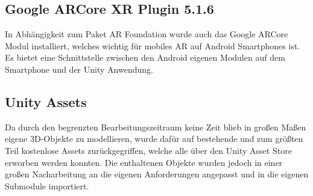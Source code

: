 \subsection{Google ARCore XR Plugin 5.1.6}
In Abhängigkeit zum Paket AR Foundation wurde auch das Google ARCore Modul installiert, welches wichtig für mobiles \ac{AR} auf Android Smartphones ist. Es bietet eine Schnittstelle zwischen den Android eigenen Modulen auf dem Smartphone und der Unity Anwendung.

\subsection{Unity Assets}
Da durch den begrenzten Bearbeitungszeitraum keine Zeit blieb in großen Maßen eigene \ac{3D}-Objekte zu modellieren, wurde dafür auf bestehende und zum größten Teil kostenlose Assets zurückgegriffen, welche alle über den Unity Asset Store erworben werden konnten. Die enthaltenen Objekte wurden jedoch in einer großen Nacharbeitung an die eigenen Anforderungen angepasst und in die eigenen Submodule importiert.
